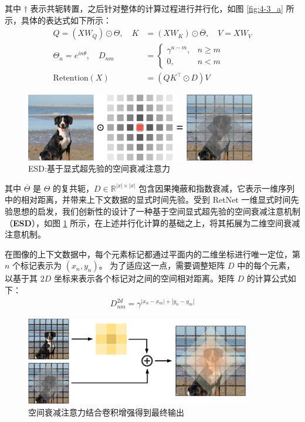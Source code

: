 其中 $\dagger$ 表示共轭转置，之后针对整体的计算过程进行并行化，如图 \ref{fig:4-3_a} 所示，具体的表达式如下所示：
\begin{align}
    Q=(XW_Q)\odot\Theta,\quad K &=(XW_K)\odot\overline{\Theta},\quad V=XW_V\\
    \Theta_n= e^{in\theta},\quad D_{nm}&=\begin{cases}\gamma^{n-m},&n\geq m\\0,&n<m\end{cases}\\
    \text{Retention}(X) &=(QK^\intercal\odot D)V
\end{align}

\begin{figure}[ht]
  \centering
  \includegraphics[width=0.9\textwidth]{./Img/空间衰减注意力.pdf}
  \caption{ESD:基于显式超先验的空间衰减注意力}\label{fig:4-5}
\end{figure}


其中 $\overline{\Theta}$ 是 $\Theta$ 的复共轭，$D\in \mathbb{R}^{|x|\times|x|}$ 包含因果掩蔽和指数衰减，它表示一维序列中的相对距离，并带来上下文数据的显式时间先验。受到 RetNet 一维显式时间先验思想的启发，我们创新性的设计了一种基于空间显式超先验的空间衰减注意机制（\textbf{ESD}），如图 \ref{fig:4-5} 所示，在上述并行化计算的基础之上，将其拓展为二维空间衰减注意机制。

在图像的上下文数据中，每个元素标记都通过平面内的二维坐标进行唯一定位，第 $n$ 个标记表示为 $(x_n, y_n)$。 为了适应这一点，需要调整矩阵 $D$ 中的每个元素，以基于其 $2D$ 坐标来表示各个标记对之间的空间相对距离。矩阵 $D$ 的计算公式如下：
\begin{align}
    D_{nm}^{2d}=\gamma^{|x_n-x_m|+|y_n-y_m|}
\end{align}

\begin{figure}[ht]
  \centering
  \includegraphics[width=0.876\textwidth]{./Img/输出结合.pdf}
  \caption{空间衰减注意力结合卷积增强得到最终输出}\label{fig:4-6}
\end{figure}



